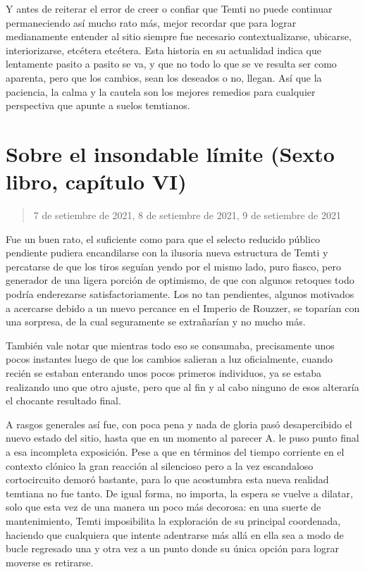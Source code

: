 \documentclass[
  spanish,
]{book}
\begin{document}
Y antes de reiterar el error de creer o confiar que Temti no puede continuar permaneciendo así mucho rato más, mejor recordar que para lograr medianamente entender al sitio siempre fue necesario contextualizarse, ubicarse, interiorizarse, etcétera etcétera. Esta historia en su actualidad indica que lentamente pasito a pasito se va, y que no todo lo que se ve resulta ser como aparenta, pero que los cambios, sean los deseados o no, llegan. Así que la paciencia, la calma y la cautela son los mejores remedios para cualquier perspectiva que apunte a suelos temtianos.

\hypertarget{sobre-el-insondable-luxedmite-sexto-libro-capuxedtulo-vi}{%
\section{Sobre el insondable límite (Sexto libro, capítulo VI)}\label{sobre-el-insondable-luxedmite-sexto-libro-capuxedtulo-vi}}

\begin{quote}
7 de setiembre de 2021, 8 de setiembre de 2021, 9 de setiembre de 2021
\end{quote}

Fue un buen rato, el suficiente como para que el selecto reducido público pendiente pudiera encandilarse con la ilusoria nueva estructura de Temti y percatarse de que los tiros seguían yendo por el mismo lado, puro fiasco, pero generador de una ligera porción de optimismo, de que con algunos retoques todo podría enderezarse satisfactoriamente. Los no tan pendientes, algunos motivados a acercarse debido a un nuevo percance en el Imperio de Rouzzer, se toparían con una sorpresa, de la cual seguramente se extrañarían y no mucho más.

También vale notar que mientras todo eso se consumaba, precisamente unos pocos instantes luego de que los cambios salieran a luz oficialmente, cuando recién se estaban enterando unos pocos primeros individuos, ya se estaba realizando uno que otro ajuste, pero que al fin y al cabo ninguno de esos alteraría el chocante resultado final.

A rasgos generales así fue, con poca pena y nada de gloria pasó desapercibido el nuevo estado del sitio, hasta que en un momento al parecer A. le puso punto final a esa incompleta exposición. Pese a que en términos del tiempo corriente en el contexto clónico la gran reacción al silencioso pero a la vez escandaloso cortocircuito demoró bastante, para lo que acostumbra esta nueva realidad temtiana no fue tanto. De igual forma, no importa, la espera se vuelve a dilatar, solo que esta vez de una manera un poco más decorosa: en una suerte de mantenimiento, Temti imposibilita la exploración de su principal coordenada, haciendo que cualquiera que intente adentrarse más allá en ella sea a modo de bucle regresado una y otra vez a un punto donde su única opción para lograr moverse es retirarse.
\end{document}
